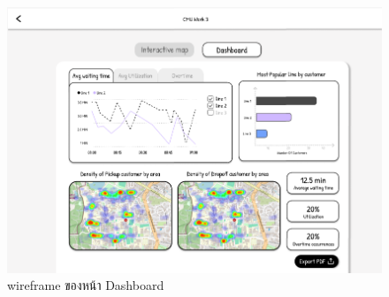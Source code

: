 \begin{mypara}
\begin{itemize}
    \begin{figure}[H]
    \centering
    \includegraphics[scale=0.4]{dashboard.png}
    \caption{wireframe ของหน้า Dashboard }
    \label{fig:WireframeDashboardGuest}
    \end{figure}
    
\end{itemize} 



\end{mypara}
